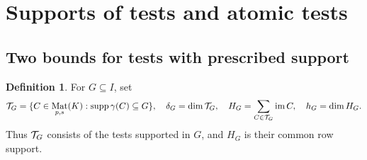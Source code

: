 \documentclass[11pt,a4paper]{article}
\numberwithin{equation}{section}
\theoremstyle{plain}
\theoremstyle{definition}
\newtheorem{definition}[theorem]{Definition}
\DeclareMathOperator{\im}{im}\DeclareMathOperator{\supp}{supp}
\DeclareMathOperator{\Mat}{Mat}\DeclareMathOperator{\Span}{span}
\begin{document}
\section{Supports of tests and atomic tests}

\subsection{Two bounds for tests with prescribed support}

\begin{definition}
For $G\subseteq I$, set
\[
 \test_G=\{C\in\Mat_{p,s}(K):\supp\gamma(C)\subseteq G\},\quad
 \delta_G=\dim\test_G,\quad
 H_G=\sum_{C\in\test_G}\im C,\quad h_G=\dim H_G.
\]
Thus $\mathcal T_G$ consists of the tests supported in $G$, and $H_G$ is
their common row support.
\end{definition}
\end{document}
